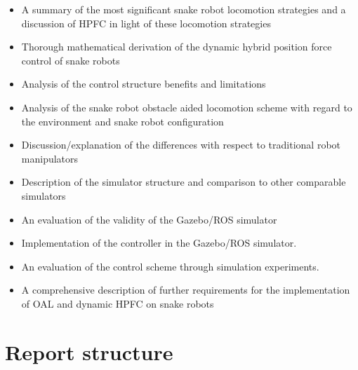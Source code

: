 \begin{itemize}
    \item A summary of the most significant snake robot locomotion strategies and a discussion of HPFC in light of these locomotion strategies
    \item Thorough mathematical derivation of the dynamic hybrid position force control of snake robots
    \item Analysis of the control structure benefits and limitations
    \item Analysis of the snake robot obstacle aided locomotion scheme with regard to the environment and snake robot configuration
    \item Discussion/explanation of the differences with respect to traditional robot manipulators
    \item Description of the simulator structure and comparison to other comparable simulators
    \item An evaluation of the validity of the Gazebo/ROS simulator
    \item Implementation of the controller in the Gazebo/ROS simulator.
    \item An evaluation of the control scheme through simulation experiments.
    \item A comprehensive description of further requirements for the implementation of OAL and dynamic HPFC on snake robots 
\end{itemize}


\section{Report structure}